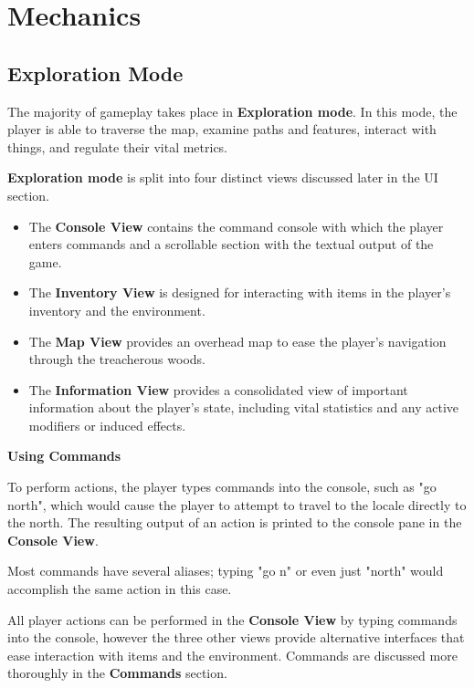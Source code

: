 \documentclass[11pt]{article}
\begin{document}
	\section{Mechanics}
	
	\subsection{Exploration Mode}
	
	The majority of gameplay takes place in \textbf{Exploration mode}. In this mode, the player is able to traverse the map, examine paths and features, interact with things, and regulate their vital metrics.
	
	\textbf{Exploration mode} is split into four distinct views discussed later in the UI section.
	
	\begin{itemize}
		\item The \textbf{Console View} contains the command console with which the player enters commands and a scrollable section with the textual output of the game.
		\item The \textbf{Inventory View} is designed for interacting with items in the player's inventory and the environment.
		\item The \textbf{Map View} provides an overhead map to ease the player's navigation through the treacherous woods.
		\item The \textbf{Information View} provides a consolidated view of important information about the player's state, including vital statistics and any active modifiers or induced effects.
	\end{itemize}

	\textbf{Using Commands}
	\newline
	
	To perform actions, the player types commands into the console, such as "go north", which would cause the player to attempt to travel to the locale directly to the north. The resulting output of an action is printed to the console pane in the \textbf{Console View}.
	
	Most commands have several aliases; typing "go n" or even just "north" would accomplish the same action in this case.
	
	All player actions can be performed in the \textbf{Console View} by typing commands into the console, however the three other views provide alternative interfaces that ease interaction with items and the environment. Commands are discussed more thoroughly in the \textbf{Commands} section.\linebreak
	
\end{document}

